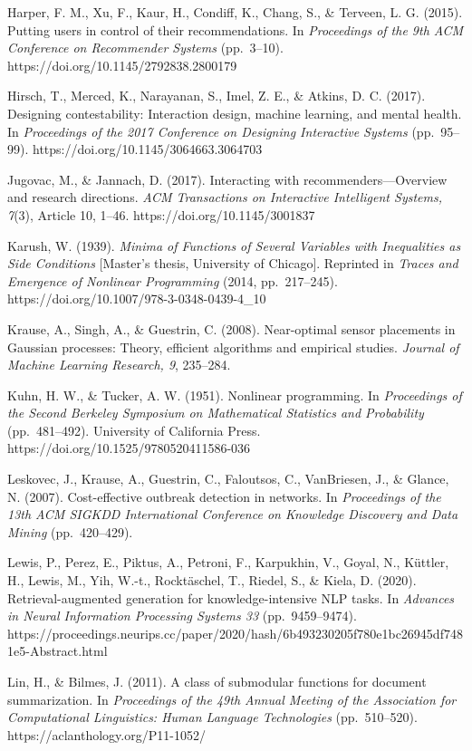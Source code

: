 \documentclass[
  11pt]{article}
\begin{document}
Harper, F. M., Xu, F., Kaur, H., Condiff, K., Chang, S., \& Terveen, L.
G. (2015). Putting users in control of their recommendations. In
\emph{Proceedings of the 9th ACM Conference on Recommender Systems}
(pp.~3--10). https://doi.org/10.1145/2792838.2800179

Hirsch, T., Merced, K., Narayanan, S., Imel, Z. E., \& Atkins, D. C.
(2017). Designing contestability: Interaction design, machine learning,
and mental health. In \emph{Proceedings of the 2017 Conference on
Designing Interactive Systems} (pp.~95--99).
https://doi.org/10.1145/3064663.3064703

Jugovac, M., \& Jannach, D. (2017). Interacting with
recommenders---Overview and research directions. \emph{ACM Transactions
on Interactive Intelligent Systems, 7}(3), Article 10, 1--46.
https://doi.org/10.1145/3001837

Karush, W. (1939). \emph{Minima of Functions of Several Variables with
Inequalities as Side Conditions} {[}Master's thesis, University of
Chicago{]}. Reprinted in \emph{Traces and Emergence of Nonlinear
Programming} (2014, pp.~217--245).
https://doi.org/10.1007/978-3-0348-0439-4\_10

Krause, A., Singh, A., \& Guestrin, C. (2008). Near-optimal sensor
placements in Gaussian processes: Theory, efficient algorithms and
empirical studies. \emph{Journal of Machine Learning Research, 9},
235--284.

Kuhn, H. W., \& Tucker, A. W. (1951). Nonlinear programming. In
\emph{Proceedings of the Second Berkeley Symposium on Mathematical
Statistics and Probability} (pp.~481--492). University of California
Press. https://doi.org/10.1525/9780520411586-036

Leskovec, J., Krause, A., Guestrin, C., Faloutsos, C., VanBriesen, J.,
\& Glance, N. (2007). Cost-effective outbreak detection in networks. In
\emph{Proceedings of the 13th ACM SIGKDD International Conference on
Knowledge Discovery and Data Mining} (pp.~420--429).

Lewis, P., Perez, E., Piktus, A., Petroni, F., Karpukhin, V., Goyal, N.,
Küttler, H., Lewis, M., Yih, W.-t., Rocktäschel, T., Riedel, S., \&
Kiela, D. (2020). Retrieval-augmented generation for knowledge-intensive
NLP tasks. In \emph{Advances in Neural Information Processing Systems
33} (pp.~9459--9474).
https://proceedings.neurips.cc/paper/2020/hash/6b493230205f780e1bc26945df7481e5-Abstract.html

Lin, H., \& Bilmes, J. (2011). A class of submodular functions for
document summarization. In \emph{Proceedings of the 49th Annual Meeting
of the Association for Computational Linguistics: Human Language
Technologies} (pp.~510--520). https://aclanthology.org/P11-1052/
\end{document}
